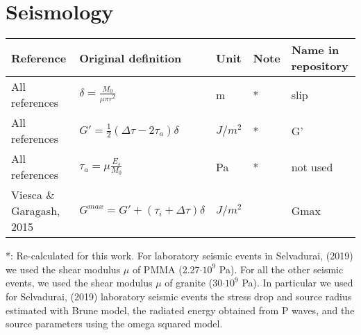 \documentclass[12pt]{article}
\begin{document}
\section{Seismology}

\begin{longtable}{|p{3.5 cm}|p{6.5 cm}|p{1.25 cm}|p{1.25 cm}|p{1.5 cm}|}
\hline
\textbf{Reference} & \textbf{Original definition} & \textbf{Unit} & \textbf{Note} & \textbf{Name in repository} \\ \hline
All references & \( \displaystyle \delta= \frac{M_0}{\mu \pi r^2} \) & m & * & slip \\
All references & \( \displaystyle G'= \frac{1}{2}(\Delta \tau - 2\tau_a)\delta \) & $J/m^2$ & *  & G' \\
All references & \( \displaystyle \tau_a = \mu \frac{E_s}{M_0} \) & Pa & * & not used \\
Viesca \& Garagash, 2015 & \( \displaystyle G^{max}=G'+(\tau_i + \Delta \tau)\delta \) & $J/m^2$ & & Gmax \\

\hline
\end{longtable}
*: Re-calculated for this work. For laboratory seismic events in Selvadurai, (2019) we used the shear modulus $\mu$ of PMMA (2.27$\cdot10^9$ Pa). For all the other seismic events, we used the shear modulus $\mu$ of granite (30$\cdot10^9$ Pa). In particular we used for Selvadurai, (2019) laboratory seismic events the stress drop and source radius estimated with Brune model, the radiated energy obtained from P waves, and the source parameters using the omega squared model.				

% 
% 
\end{document}

